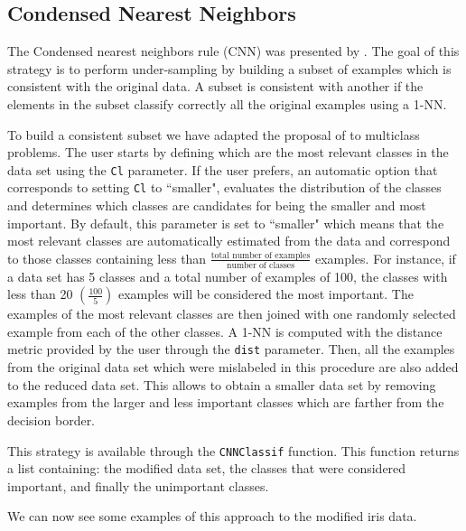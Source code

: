 \documentclass[10pt,a4paper]{article}\usepackage[]{graphicx}\usepackage[]{color}
\begin{document}
\subsection{Condensed Nearest Neighbors}\label{sec:CNN}

The Condensed nearest neighbors rule (CNN) was presented by \cite{cnn}. The goal of this strategy is to perform under-sampling by building a subset of examples which is consistent with the original data. A subset is consistent with another if the elements in the subset classify correctly all the original examples using a 1-NN. 


To build a consistent subset we have adapted the proposal of \cite{KM97} to multiclass problems. The user starts by defining which are the most relevant classes in the data set using the \texttt{Cl} parameter. If the user prefers, an automatic option that corresponds to setting \texttt{Cl} to ``smaller", evaluates the distribution of the classes and determines which classes are candidates for being the smaller and most important. By default, this parameter is set to ``smaller" which means that the most relevant classes are automatically estimated from the data and correspond to those classes containing less than $\frac{\text{total number of examples}}{\text{number of classes}}$ examples. For instance, if a data set has 5 classes and a total number of examples of 100, the classes with less than 20 $(\frac{100}{5})$ examples will be considered the most important. The examples of the most relevant classes are then joined with one randomly selected example from each of the other classes. A 1-NN is computed with the distance metric provided by the user through the \texttt{dist} parameter. Then, all the examples from the original data set which were mislabeled in this procedure are also added to the reduced data set. This allows to obtain a smaller data set by removing examples from the larger and less important classes which are farther from the decision border.

This strategy is available through the \texttt{CNNClassif} function. This function returns a list containing: the modified data set, the classes that were considered important, and finally the unimportant classes.


We can now see some examples of this approach to the modified iris data.
\end{document}
